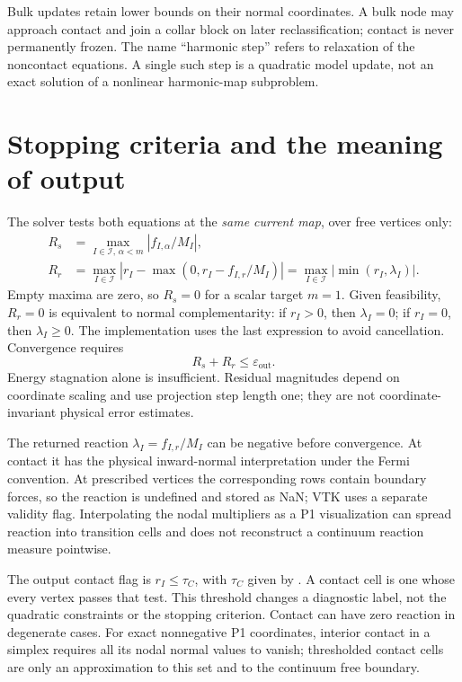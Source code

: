 \documentclass[11pt,a4paper]{article}
\newcommand{\code}[1]{\texttt{\detokenize{#1}}}
\newcommand{\free}{\mathcal I}
\begin{document}
Bulk updates retain lower bounds on their normal coordinates. A bulk node
may approach contact and join a collar block on later reclassification;
contact is never permanently frozen. The name ``harmonic step'' refers to
relaxation of the noncontact equations. A single such step is a quadratic
model update, not an exact solution of a nonlinear harmonic-map subproblem.

\section{Stopping criteria and the meaning of output}
\label{sec:stopping}

The solver tests both equations at the \emph{same current map}, over free
vertices only:
\begin{align}
 R_s&=\max_{I\in\free,\,\alpha<m}|f_{I,\alpha}/M_I|,\\
 R_r&=\max_{I\in\free}\left|r_I-\max(0,r_I-f_{I,r}/M_I)\right|
     =\max_{I\in\free}|\min(r_I,\lambda_I)|.
 \label{eq:outer-residuals}
\end{align}
Empty maxima are zero, so \(R_s=0\) for a scalar target \(m=1\).
Given feasibility, \(R_r=0\) is equivalent to normal complementarity:
if \(r_I>0\), then \(\lambda_I=0\); if \(r_I=0\), then
\(\lambda_I\geq0\). The implementation uses the last expression to avoid
cancellation. Convergence requires
\begin{equation}
 R_s+R_r\leq\varepsilon_{\mathrm{out}}.
\end{equation}
Energy stagnation alone is insufficient. Residual magnitudes depend on
coordinate scaling and use projection step length one; they are not
coordinate-invariant physical error estimates.

The returned reaction \(\lambda_I=f_{I,r}/M_I\) can be negative before
convergence. At contact it has the physical inward-normal interpretation
under the Fermi convention. At prescribed vertices the corresponding rows
contain boundary forces, so the reaction is undefined and stored as NaN;
VTK uses a separate validity flag. Interpolating the nodal multipliers as a
P1 visualization can spread reaction into transition cells and does not
reconstruct a continuum reaction measure pointwise.

The output contact flag is \(r_I\leq\tau_C\), with \(\tau_C\) given by
\code{contact_tolerance}. A contact cell is one whose every vertex passes
that test. This threshold changes a diagnostic label, not the quadratic
constraints or the stopping criterion. Contact can have zero reaction in
degenerate cases. For exact nonnegative P1 coordinates, interior contact
in a simplex requires all its nodal normal values to vanish; thresholded
contact cells are only an approximation to this set and to the continuum
free boundary.
\end{document}
